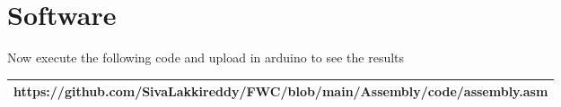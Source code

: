 \documentclass{article}
\begin{document}
\section{Software}
   Now execute the following code  and upload  in arduino to see the results \\
   \vspace{5mm}
   \begin{tabularx}{1.1\textwidth} { 
  | >{\centering\arraybackslash}X |}
  \hline
  https://github.com/SivaLakkireddy/FWC/blob/main/Assembly/code/assembly.asm \\
  \hline
\end{tabularx}
\end{document}
